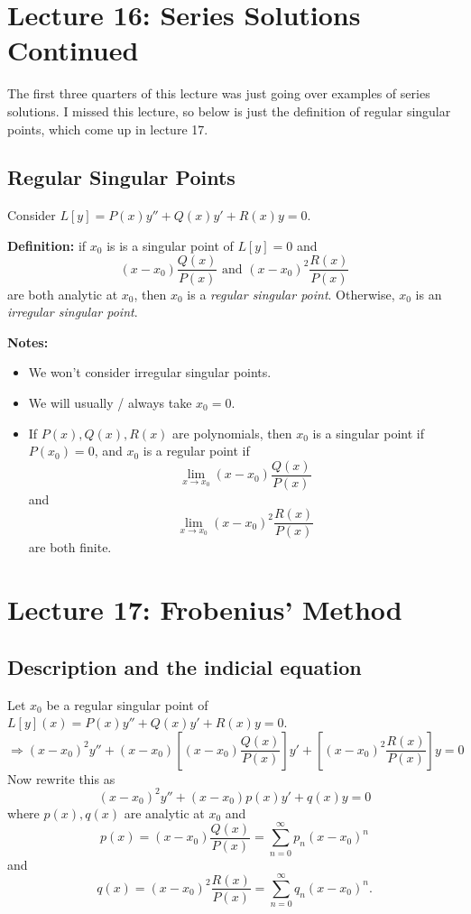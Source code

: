\documentclass[11pt]{article}
\newcommand{\definition}{\textbf{Definition: }}
\newcommand{\sumseries}{\sum_{n=0}^{\infty}}
\newcommand{\powerser}{(x - x_0)^n}
\begin{document}

\section{Lecture 16: Series Solutions Continued}
	The first three quarters of this lecture was just going over examples of series solutions. I missed this lecture, so below is just the definition of regular singular points, which come up in lecture 17.
\subsection{Regular Singular Points}
	Consider $L[y] = P(x) y'' + Q(x)y' + R(x)y = 0$.

	\definition if $x_0$ is is a singular point of $L[y]=0$ and
		$$ (x-x_0) \frac{Q(x)}{P(x)} \text{ and } (x-x_0)^2 \frac{R(x)}{P(x)} $$
	are both analytic at $x_0$, then $x_0$ is a \emph{regular singular point}. Otherwise, $x_0$ is an \emph{irregular singular point}.

	\textbf{Notes:}
		\begin{itemize}
			\item We won't consider irregular singular points.
			\item We will usually / always take $x_0 = 0$.
			\item If $P(x), Q(x), R(x)$ are polynomials, then $x_0$ is a singular point if $P(x_0) = 0$, and $x_0$ is a regular point if
				$$ \lim_{x\to x_0} (x-x_0) \frac{Q(x)}{P(x)} $$
			and
				$$ \lim_{x\to x_0} (x-x_0)^2 \frac{R(x)}{P(x)} $$
			are both finite.
		\end{itemize}

\section{Lecture 17: Frobenius' Method}
\subsection{Description and the indicial equation}
	Let $x_0$ be a regular singular point of $L[y](x) = P(x)y'' + Q(x)y' + R(x)y = 0$.
		$$ \Rightarrow (x - x_0)^2 y'' + (x-x_0) \left[(x-x_0) \frac{Q(x)}{P(x)} \right] y' + \left[(x-x_0)^2 \frac{R(x)}{P(x)}\right] y = 0 $$
	Now rewrite this as
		$$ (x-x_0)^2 y'' + (x-x_0) p(x) y' + q(x) y = 0 $$
	where $p(x),q(x)$ are analytic at $x_0$ and
		$$ p(x) = (x-x_0) \frac{Q(x)}{P(x)} = \sumseries p_n \powerser $$
	and
		$$ q(x) = (x-x_0)^2 \frac{R(x)}{P(x)} = \sumseries q_n \powerser .$$
\end{document}
